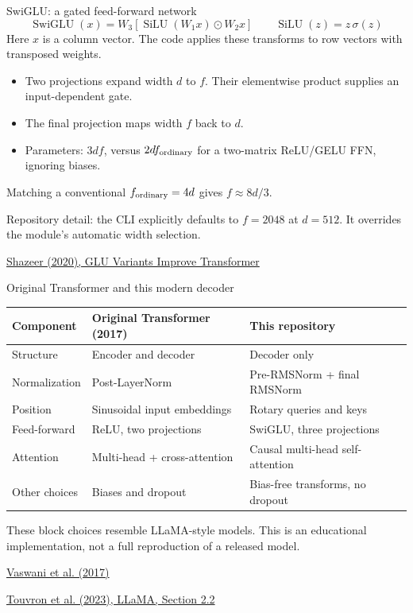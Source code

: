 \documentclass[11pt,aspectratio=169]{beamer}
\newcommand{\paper}[2]{\par{\scriptsize\color{muted}\href{#2}{#1}\par}}
\begin{document}
\begin{frame}{SwiGLU: a gated feed-forward network}
\[
\operatorname{SwiGLU}(x)=W_3\left[\operatorname{SiLU}(W_1x)\odot W_2x\right]
\qquad \operatorname{SiLU}(z)=z\,\sigma(z)
\]
Here $x$ is a column vector. The code applies these transforms to row vectors with transposed weights.
\begin{itemize}
\item Two projections expand width $d$ to $f$. Their elementwise product supplies an input-dependent gate.
\item The final projection maps width $f$ back to $d$.
\item Parameters: $3df$, versus $2df_{\rm ordinary}$ for a two-matrix ReLU/GELU FFN, ignoring biases.
\end{itemize}
Matching a conventional $f_{\rm ordinary}=4d$ gives $f\approx 8d/3$.\par
\alert{Repository detail:} the CLI explicitly defaults to $f=2048$ at $d=512$. It overrides the module's automatic width selection.
\paper{Shazeer (2020), GLU Variants Improve Transformer}{https://arxiv.org/abs/2002.05202}
\end{frame}

\begin{frame}{Original Transformer and this modern decoder}
\small
\begin{tabular}{@{}>{\raggedright\arraybackslash}p{}>{\raggedright\arraybackslash}p{}>{\raggedright\arraybackslash}p{}@{}}
\toprule
Component & Original Transformer (2017) & This repository\\\midrule
Structure & Encoder and decoder & Decoder only\\[2mm]
Normalization & Post-LayerNorm & Pre-RMSNorm + final RMSNorm\\[2mm]
Position & Sinusoidal input embeddings & Rotary queries and keys\\[2mm]
Feed-forward & ReLU, two projections & SwiGLU, three projections\\[2mm]
Attention & Multi-head + cross-attention & Causal multi-head self-attention\\[2mm]
Other choices & Biases and dropout & Bias-free transforms, no dropout\\\bottomrule
\end{tabular}\par
\par\vspace{3mm}
These block choices resemble LLaMA-style models. This is an educational implementation, not a full reproduction of a released model.
\paper{Vaswani et al. (2017)}{https://arxiv.org/abs/1706.03762}
\paper{Touvron et al. (2023), LLaMA, Section 2.2}{https://arxiv.org/abs/2302.13971}
\end{frame}
\end{document}

